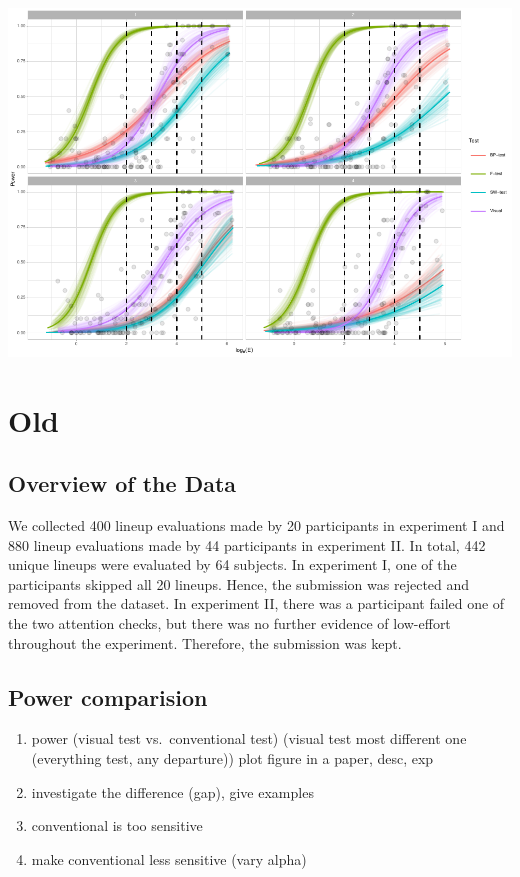 \documentclass[]{interact}
\theoremstyle{plain}%
\theoremstyle{definition}
\theoremstyle{remark}
\def\tightlist{}
\begin{document}
\includegraphics{paper_comparison_files/figure-latex/unnamed-chunk-10-1.pdf}

\hypertarget{old}{%
\section{Old}\label{old}}

\hypertarget{overview-of-the-data}{%
\subsection{Overview of the Data}\label{overview-of-the-data}}

We collected 400 lineup evaluations made by 20 participants in
experiment I and 880 lineup evaluations made by 44 participants in
experiment II. In total, 442 unique lineups were evaluated by 64
subjects. In experiment I, one of the participants skipped all 20
lineups. Hence, the submission was rejected and removed from the
dataset. In experiment II, there was a participant failed one of the two
attention checks, but there was no further evidence of low-effort
throughout the experiment. Therefore, the submission was kept.

\hypertarget{power-comparision}{%
\subsection{Power comparision}\label{power-comparision}}

\begin{enumerate}
\def\labelenumi{\arabic{enumi}.}
\tightlist
\item
  power (visual test vs.~conventional test) (visual test most different
  one (everything test, any departure)) plot figure in a paper, desc,
  exp
\item
  investigate the difference (gap), give examples
\item
  conventional is too sensitive
\item
  make conventional less sensitive (vary alpha)
\end{enumerate}
\end{document}
